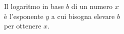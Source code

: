 \documentclass[preview]{standalone}
\begin{document}
\begin{center}
Il logaritmo in base $b$ di un numero $x$\\è l'esponente $y$ a cui bisogna elevare $b$\\per ottenere $x$.
\end{center}
\end{document}
